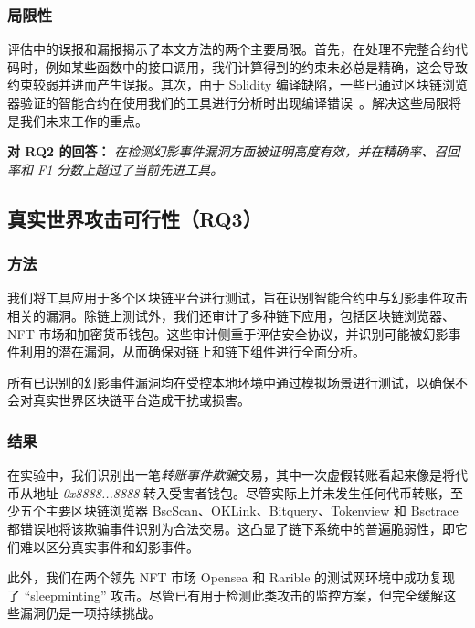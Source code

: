 \subsubsection{局限性}

评估中的误报和漏报揭示了本文方法的两个主要局限。首先，在处理不完整合约代码时，例如某些函数中的接口调用，我们计算得到的约束未必总是精确，这会导致约束较弱并进而产生误报。其次，由于 Solidity 编译缺陷，一些已通过区块链浏览器验证的智能合约在使用我们的工具进行分析时出现编译错误~\cite{compile_issue}。解决这些局限将是我们未来工作的重点。


\vspace{\baselineskip}
\begin{mdframed}
\noindent\textbf{对 RQ2 的回答：} \textit{\tool 在检测幻影事件漏洞方面被证明高度有效，并在精确率、召回率和 F1 分数上超过了当前先进工具。}
\end{mdframed}

\subsection{真实世界攻击可行性（RQ3）}
\subsubsection{方法}
我们将工具应用于多个区块链平台进行测试，旨在识别智能合约中与幻影事件攻击相关的漏洞。除链上测试外，我们还审计了多种链下应用，包括区块链浏览器、NFT 市场和加密货币钱包。这些审计侧重于评估安全协议，并识别可能被幻影事件利用的潜在漏洞，从而确保对链上和链下组件进行全面分析。

所有已识别的幻影事件漏洞均在受控本地环境中通过模拟场景进行测试，以确保不会对真实世界区块链平台造成干扰或损害。

\subsubsection{结果}

在实验中，我们识别出一笔\emph{转账事件欺骗}交易，其中一次虚假转账看起来像是将代币从地址 \textit{0x8888...8888} 转入受害者钱包。尽管实际上并未发生任何代币转账，至少五个主要区块链浏览器 BscScan、OKLink、Bitquery、Tokenview 和 Bsctrace~\cite{bscscan,oklink,bitquery,tokenview,bsctrace} 都错误地将该欺骗事件识别为合法交易。这凸显了链下系统中的普遍脆弱性，即它们难以区分真实事件和幻影事件。

此外，我们在两个领先 NFT 市场 Opensea 和 Rarible 的测试网环境中成功复现了 ``sleepminting'' 攻击。尽管已有用于检测此类攻击的监控方案，但完全缓解这些漏洞仍是一项持续挑战。

